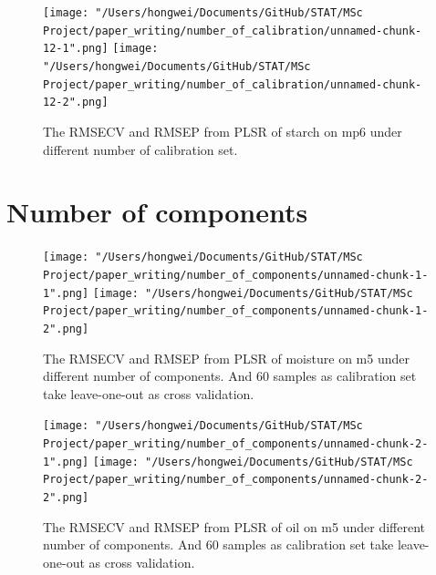 \documentclass[a4paper,12pt,titlepage]{article} %
\numberwithin{equation}{section}  %
\begin{document}
\begin{appendices}
			\begin{figure}[h]    %
	\centering           %
	\texttt{[image: "/Users/hongwei/Documents/GitHub/STAT/MSc Project/paper\_writing/number\_of\_calibration/unnamed-chunk-12-1".png]}  %
	\texttt{[image: "/Users/hongwei/Documents/GitHub/STAT/MSc Project/paper\_writing/number\_of\_calibration/unnamed-chunk-12-2".png]}  %
	\caption{The RMSECV and RMSEP from PLSR of starch on mp6 under different number of calibration set.}          %
	\label{fig:calibration_12-1}               %
\end{figure}                        %
		
		
		
		
		
		
		\clearpage
		\section{Number of components}
		\label{app:Number_of_components}
				
	\begin{figure}[h]    %
		\centering           %
		\texttt{[image: "/Users/hongwei/Documents/GitHub/STAT/MSc Project/paper\_writing/number\_of\_components/unnamed-chunk-1-1".png]}  %
		\texttt{[image: "/Users/hongwei/Documents/GitHub/STAT/MSc Project/paper\_writing/number\_of\_components/unnamed-chunk-1-2".png]}  %
		\caption{The RMSECV and RMSEP from PLSR of moisture on m5 under different number of components. And 60 samples as calibration set take leave-one-out as cross validation.}          %
		\label{fig:components_1-1}               %
	\end{figure}                        %
	
	\begin{figure}[h]    %
		\centering           %
		\texttt{[image: "/Users/hongwei/Documents/GitHub/STAT/MSc Project/paper\_writing/number\_of\_components/unnamed-chunk-2-1".png]}  %
		\texttt{[image: "/Users/hongwei/Documents/GitHub/STAT/MSc Project/paper\_writing/number\_of\_components/unnamed-chunk-2-2".png]}  %
		\caption{The RMSECV and RMSEP from PLSR of oil on m5 under different number of components. And 60 samples as calibration set take leave-one-out as cross validation.}          %
		\label{fig:components_2-1}               %
	\end{figure}                        %
	

\end{appendices}
\end{document}
